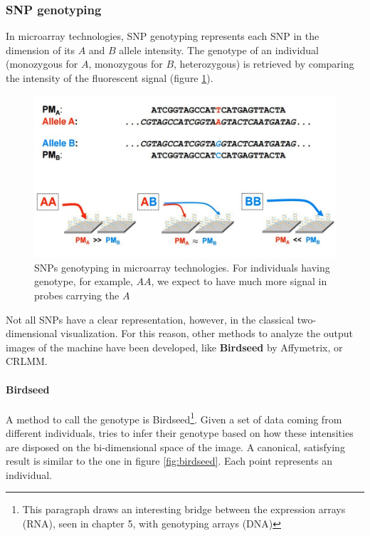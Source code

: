 		\subsubsection{SNP genotyping}
		In microarray technologies, SNP genotyping represents each SNP in the dimension of its $A$ and $B$ allele intensity.
		The genotype of an individual (monozygous for $A$, monozygous for $B$, heterozygous) is retrieved by comparing the intensity of the fluorescent signal (figure \ref{fig:geno}). 
		
		\begin{figure}[H]
				\centering
				\includegraphics[scale=0.3]{genotype}
				\caption{SNPs genotyping in microarray technologies. For individuals having genotype, for example, $AA$, we expect to have much more signal in probes carrying the $A$ }
				\label{fig:geno}
				\end{figure}
				
			Not all SNPs have a clear representation, however, in the classical two-dimensional visualization.
			For this reason, other methods to analyze the output images of the machine have been developed, like \textbf{Birdseed} by Affymetrix, or CRLMM.

			\paragraph{Birdseed}
			A method to call the genotype is Birdseed\footnote{This paragraph draws an interesting bridge between the expression arrays (RNA), seen in chapter 5, with genotyping arrays (DNA)}.
			Given a set of data coming from different individuals, tries to infer their genotype based on how these intensities are disposed on the bi-dimensional space of the image.
			A canonical, satisfying result is similar to the one in figure \ref{fig:birdseed}. 
			Each point represents an individual. 
						
